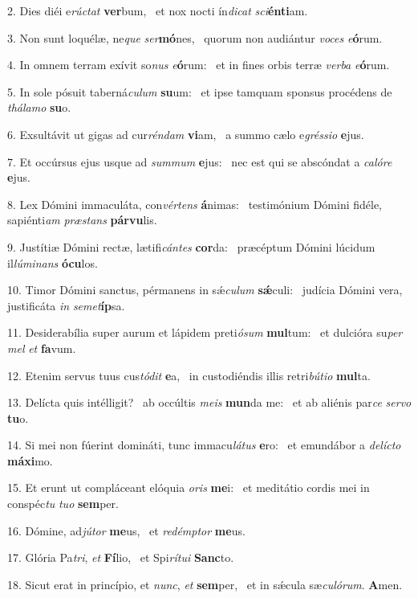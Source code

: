 2. Dies diéi e\textit{rúc}\textit{tat} \textbf{ver}bum, \ast\  et nox nocti ín\textit{di}\textit{cat} \textit{sci}\textbf{én}\textbf{ti}am.\

3. Non sunt loquélæ, ne\textit{que} \textit{ser}\textbf{mó}nes, \ast\  quorum non audiántur \textit{vo}\textit{ces} \textit{e}\textbf{ó}rum.\

4. In omnem terram exívit so\textit{nus} \textit{e}\textbf{ó}rum: \ast\  et in fines orbis terræ \textit{ver}\textit{ba} \textit{e}\textbf{ó}rum.\

5. In sole pósuit taberná\textit{cu}\textit{lum} \textbf{su}um: \ast\  et ipse tamquam sponsus procédens de \textit{thá}\textit{la}\textit{mo} \textbf{su}o.\

6. Exsultávit ut gigas ad cur\textit{rén}\textit{dam} \textbf{vi}am, \ast\  a summo cælo e\textit{grés}\textit{si}\textit{o} \textbf{e}jus.\

7. Et occúrsus ejus usque ad \textit{sum}\textit{mum} \textbf{e}jus: \ast\  nec est qui se abscóndat a \textit{ca}\textit{ló}\textit{re} \textbf{e}jus.\

8. Lex Dómini immaculáta, con\textit{vér}\textit{tens} \textbf{á}nimas: \ast\  testimónium Dómini fidéle, sapiénti\textit{am} \textit{præ}\textit{stans} \textbf{pár}\textbf{vu}lis.\

9. Justítiæ Dómini rectæ, lætifi\textit{cán}\textit{tes} \textbf{cor}da: \ast\  præcéptum Dómini lúcidum il\textit{lú}\textit{mi}\textit{nans} \textbf{ó}\textbf{cu}los.\

10. Timor Dómini sanctus, pérmanens in sǽ\textit{cu}\textit{lum} \textbf{sǽ}culi: \ast\  judícia Dómini vera, justificáta \textit{in} \textit{se}\textit{met}\textbf{íp}sa.\

11. Desiderabília super aurum et lápidem preti\textit{ó}\textit{sum} \textbf{mul}tum: \ast\  et dulcióra su\textit{per} \textit{mel} \textit{et} \textbf{fa}vum.\

12. Etenim servus tuus cus\textit{tó}\textit{dit} \textbf{e}a, \ast\  in custodiéndis illis retri\textit{bú}\textit{ti}\textit{o} \textbf{mul}ta.\

13. Delícta quis intélligit? \dag\  ab occúltis \textit{me}\textit{is} \textbf{mun}da me: \ast\  et ab aliénis par\textit{ce} \textit{ser}\textit{vo} \textbf{tu}o.\

14. Si mei non fúerint domináti, tunc immacu\textit{lá}\textit{tus} \textbf{e}ro: \ast\  et emundábor a \textit{de}\textit{líc}\textit{to} \textbf{má}\textbf{xi}mo.\

15. Et erunt ut compláceant elóquia \textit{o}\textit{ris} \textbf{me}i: \ast\  et meditátio cordis mei in conspéc\textit{tu} \textit{tu}\textit{o} \textbf{sem}per.\

16. Dómine, ad\textit{jú}\textit{tor} \textbf{me}us, \ast\  et \textit{red}\textit{émp}\textit{tor} \textbf{me}us.\

17. Glória Pa\textit{tri}, \textit{et} \textbf{Fí}lio, \ast\  et Spi\textit{rí}\textit{tu}\textit{i} \textbf{Sanc}to.\

18. Sicut erat in princípio, et \textit{nunc}, \textit{et} \textbf{sem}per, \ast\  et in sǽcula sæ\textit{cu}\textit{ló}\textit{rum}. \textbf{A}men.\

